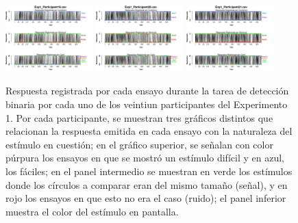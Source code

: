 \begin{figure}[th]
\includegraphics[width=0.30\textwidth]{Figures/BiasResp_Exp1_P19} \includegraphics[width=0.30\textwidth]{Figures/BiasResp_Exp1_P20} \includegraphics[width=0.30\textwidth]{Figures/BiasResp_Exp1_P21}
\caption[ _Ex1]{Respuesta registrada por cada ensayo durante la tarea de detección binaria por cada uno de los veintiun participantes del Experimento 1. Por cada participante, se muestran tres gráficos distintos que relacionan la respuesta emitida en cada ensayo con la naturaleza del estímulo en cuestión; en el gráfico superior, se señalan con color púrpura los ensayos en que se mostró un estímulo difícil y en azul, los fáciles; en el panel intermedio se muestran en verde los estímulos donde los círculos a comparar eran del mismo tamaño (señal), y en rojo los ensayos en que esto no era el caso (ruido); el panel inferior muestra el color del estímulo en pantalla.}
\label{fig:BiasResp_E1}
\end{figure}

